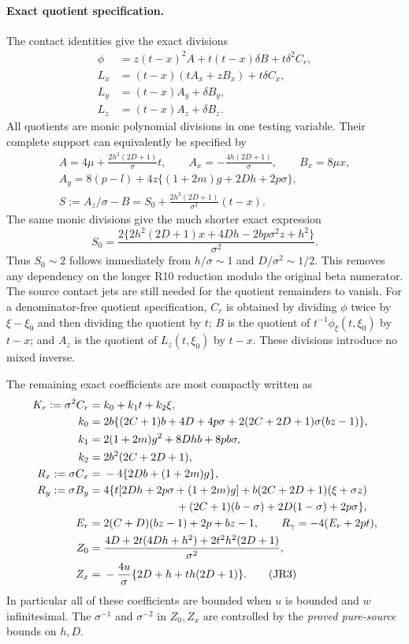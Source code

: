 \paragraph{Exact quotient specification.}
The contact identities give the exact divisions
\begin{align*}
 \phi&=z(t-x)^2A+t(t-x)\delta B+t\delta^2C_r,\\
 L_x&=(t-x)(tA_x+zB_x)+t\delta C_x,\\
 L_y&=(t-x)A_y+\delta B_y,\\
 L_z&=(t-x)A_z+\delta B_z.
\end{align*}
All quotients are monic polynomial divisions in one testing variable.
Their complete support can equivalently be specified by
\begin{gather*}
 A=4\mu+\frac{2h^2(2D+1)}\sigma t,\qquad
 A_x=-\frac{4h(2D+1)}\sigma,\qquad B_x=8\mu x,\\
 A_y=8(p-l)+4z\{(1+2m)g+2Dh+2p\sigma\},\\
 S:=A_z/\sigma-B=S_0+
       \frac{2h^2(2D+1)}{\sigma^2}(t-x).
\tag{JR2}
\end{gather*}
The same monic divisions give the much shorter exact expression
\[
 S_0=\frac{2\{2h^2(2D+1)x+4Dh-2bp\sigma^2z+h^2\}}{\sigma^2}.
\tag{JR2a}
\]
Thus $S_0\sim2$ follows immediately from $h/\sigma\sim1$ and
$D/\sigma^2\sim1/2$. This removes any dependency on the longer R10
reduction modulo the original beta numerator. The source contact jets
are still needed for the quotient remainders to vanish.
For a denominator-free quotient specification, $C_r$ is obtained by
dividing $\phi$ twice by $\xi-\xi_0$ and then dividing the quotient
by $t$; $B$ is the quotient of
$t^{-1}\phi_\xi(t,\xi_0)$ by $t-x$; and $A_z$ is the quotient of
$L_z(t,\xi_0)$ by $t-x$. These divisions introduce no mixed inverse.

The remaining exact coefficients are most compactly written as
\begin{align*}
 K_r:=\sigma^2C_r={}&k_0+k_1t+k_2\xi,\\
 k_0={}&2b\{(2C+1)b+4D+4p\sigma
             +2(2C+2D+1)\sigma(bz-1)\},\\
 k_1={}&2(1+2m)g^2+8Dhb+8pb\sigma,\\
 k_2={}&2b^2(2C+2D+1),\\
 R_x:=\sigma C_x={}&-4\{2Db+(1+2m)g\},\\
 R_y:=\sigma B_y={}&4\{t[2Dh+2p\sigma+(1+2m)g]
      +b(2C+2D+1)(\xi+\sigma z)\\
 &\hspace{23mm} +(2C+1)(b-\sigma)+2D(1-\sigma)+2p\sigma\},\\
 E_r={}&2(C+D)(bz-1)+2p+bz-1,\qquad
 R_\gamma=-4(E_r+2pt),\\
 Z_0={}&\frac{4D+2t(4Dh+h^2)+2t^2h^2(2D+1)}{\sigma^2},\\
 Z_x={}&-\frac{4u}{\sigma}\{2D+h+th(2D+1)\}.
\tag{JR3}
\end{align*}
In particular all of these coefficients are bounded when $u$ is bounded
and $w$ infinitesimal. The $\sigma^{-1}$ and $\sigma^{-2}$ in $Z_0,Z_x$
are controlled by the \emph{proved pure-source} bounds on $h,D$.

